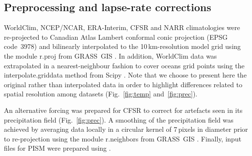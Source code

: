 
\subsection{Preprocessing and lapse-rate corrections}

WorldClim, NCEP/NCAR, ERA-Interim, CFSR and NARR climatologies were re-projected to Canadian Atlas Lambert conformal conic projection (EPSG code~3978) and bilinearly interpolated to the 10\,km-resolution model grid using the module r.proj from GRASS~GIS \citep{soft:grass}. In addition, WorldClim data was extrapolated in a nearest-neighbour fashion to cover oceans grid points using the interpolate.griddata method from Scipy \citep{soft:scipy}. Note that we choose to present here the original rather than interpolated data in order to highlight differences related to spatial resolution among datasets (Fig.~\ref{fig:temp} and~\ref{fig:prec}).

An alternative forcing was prepared for CFSR to correct for artefacts seen in its precipitation field (Fig.~\ref{fig:prec}). A smoothing of the precipitation field was achieved by averaging data locally in a circular kernel of 7\,pixels in diameter prior to re-projection using the module r.neighbors from GRASS~GIS \citep{soft:grass}. Finally, input files for PISM were prepared using \citet{web:nc4py}.
